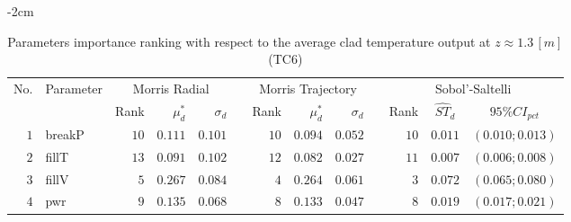 \begin{table*}[!htbp]\centering
{}
\begin{adjustwidth*}{}{-2cm}
\caption{Parameters importance ranking with respect to the average clad temperature output at $z \approx 1.3 \, [m]$ (TC$6$)}
\label{tab:app_screening_tc6_average}
\begin{tabular}{@{}rlrrrrrrrrrcc@{}}\toprule
\multirow{2}{*}{\footnotesize{No.}} & \multirow{2}{*}{\footnotesize{Parameter}} & \multicolumn{3}{c}{\footnotesize{Morris Radial}} & \phantom{a} & \multicolumn{3}{c}{\footnotesize{Morris Trajectory}}  &\phantom{a}& \multicolumn{3}{c}{\footnotesize{Sobol'-Saltelli}}                               \\             
                                                                                  \cmidrule{3-5}                                                   \cmidrule{7-9}                                                      \cmidrule{11-13}
                                    &                                           & \footnotesize{Rank}   & $\mu^*_d$ & $\sigma_d$   &             & \footnotesize{Rank} & $\mu^*_d$ & $\sigma_d$          &           & \footnotesize{Rank} & \footnotesize{$\hat{ST}_d$} & \footnotesize{$95\%CI_{pct}$}\\ \midrule
\footnotesize{$1 $} & \footnotesize{breakP   } & \footnotesize{$10$} & \footnotesize{$0.111$} & \footnotesize{$0.101$} && \footnotesize{$10$} & \footnotesize{$0.094$} & \footnotesize{$0.052$} && \footnotesize{$10$} & \footnotesize{$0.011$} & \footnotesize{$(0.010;0.013)$} \\
\footnotesize{$2 $} & \footnotesize{fillT    } & \footnotesize{$13$} & \footnotesize{$0.091$} & \footnotesize{$0.102$} && \footnotesize{$12$} & \footnotesize{$0.082$} & \footnotesize{$0.027$} && \footnotesize{$11$} & \footnotesize{$0.007$} & \footnotesize{$(0.006;0.008)$} \\
\footnotesize{$3 $} & \footnotesize{fillV    } & \footnotesize{$5 $} & \footnotesize{$0.267$} & \footnotesize{$0.084$} && \footnotesize{$4 $} & \footnotesize{$0.264$} & \footnotesize{$0.061$} && \footnotesize{$3 $} & \footnotesize{$0.072$} & \footnotesize{$(0.065;0.080)$} \\
\footnotesize{$4 $} & \footnotesize{pwr      } & \footnotesize{$9 $} & \footnotesize{$0.135$} & \footnotesize{$0.068$} && \footnotesize{$8 $} & \footnotesize{$0.133$} & \footnotesize{$0.047$} && \footnotesize{$8 $} & \footnotesize{$0.019$} & \footnotesize{$(0.017;0.021)$} \\

\end{tabular}
\end{adjustwidth*}
\end{table*}
